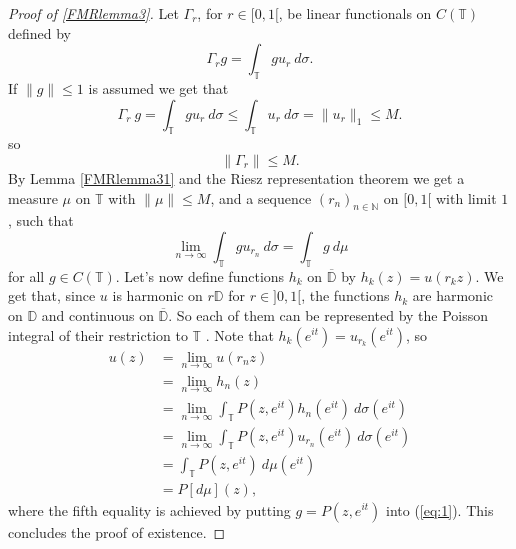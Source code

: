\documentclass[a4paper,12pt,twoside,BCOR=10mm]{scrbook}
\theoremstyle{definition}
\theoremstyle{definition}
\theoremstyle{definition}
\begin{document}
\begin{proof}[Proof of \ref{FMRlemma3}]
Let $\Gamma_r$, for $r \in [0, 1[$, be linear functionals on $C(\mathbb{T})$ defined by
\[
	\Gamma_r g = \int_{\mathbb{T}} gu_r\ d\sigma.
\]
If $\|g\| \leq 1$ is assumed we get that
\[
\Gamma_r\ g = \int_{\mathbb{T}} gu_r\ d\sigma \leq \int_{\mathbb{T}} u_r\ d\sigma = \|u_r\|_1 \leq M.
\]
so
\[
	\|\Gamma_r\| \leq M.
\]
By Lemma \ref{FMRlemma31} and the Riesz representation theorem we get a measure $\mu$ on $\mathbb{T}$ with $\|\mu\| \leq M$, and a sequence $(r_n)_{n \in \mathbb{N}}$ on $[0, 1[$ with limit $1$, such that
\begin{equation}
	\label{eq:1}
	\lim_{n \rightarrow \infty} \int_{\mathbb{T}} gu_{r_n}\ d\sigma = \int_{\mathbb{T}}g\ d\mu
\end{equation}
for all $g \in C(\mathbb{T})$.
Let's now define functions $h_k$ on $\overline{\mathbb{D}}$ by $h_k(z) = u(r_kz)$.
We get that, since $u$ is harmonic on $r\mathbb{D}$ for $r \in ]0, 1[$, the functions $h_k$ are harmonic on $\mathbb{D}$ and continuous on $\overline{\mathbb{D}}$.
So each of them can be represented by the Poisson integral of their restriction to $\mathbb{T}$ \citep[Theroem $11.9$]{rudin2}.
Note that $h_k(e^{it}) = u_{r_k}(e^{it})$, so
\begin{align*}
	u(z)
	&= \lim_{n \rightarrow \infty} u(r_nz)\\
	&= \lim_{n \rightarrow \infty} h_n(z)\\
	&= \lim_{n \rightarrow \infty} \int_{\mathbb{T}}P(z, e^{it}) h_n(e^{it})\ d\sigma(e^{it})\\
	&= \lim_{n \rightarrow \infty} \int_{\mathbb{T}}P(z, e^{it}) u_{r_n}(e^{it})\ d\sigma(e^{it})\\
	&= \int_{\mathbb{T}}P(z, e^{it})\ d\mu(e^{it})\\
	&= P[d\mu](z),
\end{align*}
where the fifth equality is achieved by putting $g = P(z, e^{it})$ into (\ref{eq:1}).
This concludes the proof of existence.


\end{proof}
\end{document}
